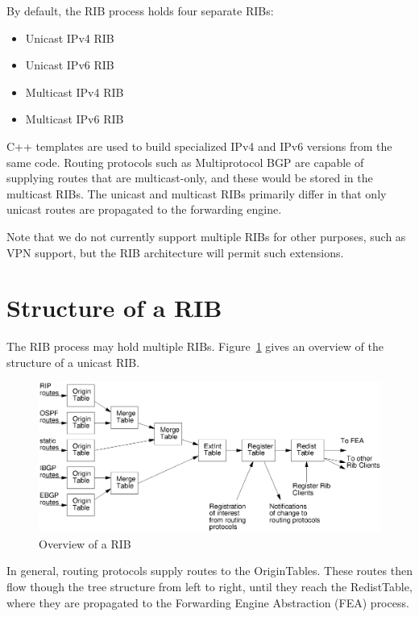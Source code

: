 \documentclass[11pt]{article}
\begin{document}
By default, the RIB process holds four separate RIBs:

\begin{itemize}
  \item Unicast IPv4 RIB
  \item Unicast IPv6 RIB
  \item Multicast IPv4 RIB
  \item Multicast IPv6 RIB
\end{itemize}

C++ templates are used to build specialized IPv4 and IPv6 versions
from the same code.  Routing protocols such as Multiprotocol BGP are
capable of supplying routes that are multicast-only, and these would
be stored in the multicast RIBs.  The unicast and multicast RIBs
primarily differ in that only unicast routes are propagated to the
forwarding engine.

Note that we do not currently support multiple RIBs for other
purposes, such as VPN support, but the RIB architecture will permit
such extensions.

\section{Structure of a RIB}
The RIB process may hold multiple RIBs.  Figure~\ref{fig:rib_overview} gives
an overview of the structure of a unicast RIB.

\begin{figure}[htb]
  \centerline{\includegraphics[width=1.0\textwidth]{figs/overview.ps}}
  \vspace{.05in}
  \caption{\label{fig:rib_overview}Overview of a RIB}
\end{figure}

In general, routing protocols supply routes to the OriginTables.
These routes then flow though the tree structure from left to right,
until they reach the RedistTable, where they are propagated to the
Forwarding Engine Abstraction (FEA) process.
\end{document}
